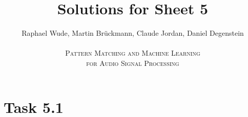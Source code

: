 \documentclass[12pt]{article}
\begin{document}
\title{Solutions for Sheet 5}
\author{Raphael Wude, Martin Brückmann, Claude Jordan, Daniel Degenstein\\ \\
\textsc{Pattern Matching and Machine Learning} \\
\textsc{for Audio Signal Processing}}
\maketitle

\section*{Task 5.1}
\end{document}
